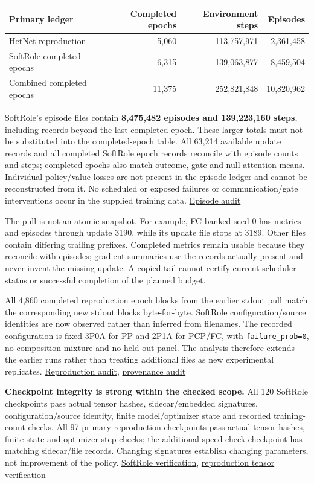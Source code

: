 \documentclass[
  10pt,
]{article}
\begin{document}
\begin{longtable}[]{@{}lrrr@{}}
\toprule\noalign{}
Primary ledger & Completed epochs & Environment steps & Episodes \\
\midrule\noalign{}
\endhead
\bottomrule\noalign{}
\endlastfoot
HetNet reproduction & 5,060 & 113,757,971 & 2,361,458 \\
SoftRole completed epochs & 6,315 & 139,063,877 & 8,459,504 \\
Combined completed epochs & 11,375 & 252,821,848 & 10,820,962 \\
\end{longtable}

SoftRole's episode files contain \textbf{8,475,482 episodes and
139,223,160 steps}, including records beyond the last completed epoch.
These larger totals must not be substituted into the completed-epoch
table. All 63,214 available update records and all completed SoftRole
epoch records reconcile with episode counts and steps; completed epochs
also match outcome, gate and null-attention means. Individual
policy/value losses are not present in the episode ledger and cannot be
reconstructed from it. No scheduled or exposed failures or
communication/gate interventions occur in the supplied training data.
\href{full_runs/softrole_audit/findings.json}{Episode audit}

The pull is not an atomic snapshot. For example, FC banked seed 0 has
metrics and episodes through update 3190, while its update file stops at
3189. Other files contain differing trailing prefixes. Completed metrics
remain usable because they reconcile with episodes; gradient summaries
use the records actually present and never invent the missing update. A
copied tail cannot certify current scheduler status or successful
completion of the planned budget.

All 4,860 completed reproduction epoch blocks from the earlier stdout
pull match the corresponding new stdout blocks byte-for-byte. SoftRole
configuration/source identities are now observed rather than inferred
from filenames. The recorded configuration is fixed 3P0A for PP and 2P1A
for PCP/FC, with \texttt{failure\_prob=0}, no composition mixture and no
held-out panel. The analysis therefore extends the earlier runs rather
than treating additional files as new experimental replicates.
\href{full_runs/reproduction_audit/findings.json}{Reproduction audit},
\href{full_runs/provenance_audit/audit.json}{provenance audit}

\textbf{Checkpoint integrity is strong within the checked scope.} All
120 SoftRole checkpoints pass actual tensor hashes, sidecar/embedded
signatures, configuration/source identity, finite model/optimizer state
and recorded training-count checks. All 97 primary reproduction
checkpoints pass actual tensor hashes, finite-state and optimizer-step
checks; the additional speed-check checkpoint has matching sidecar/file
records. Changing signatures establish changing parameters, not
improvement of the policy.
\href{full_runs/provenance_audit/audit.json}{SoftRole verification},
\href{full_runs/reproduction_audit/checkpoint_verification.json}{reproduction
tensor verification}
\end{document}
